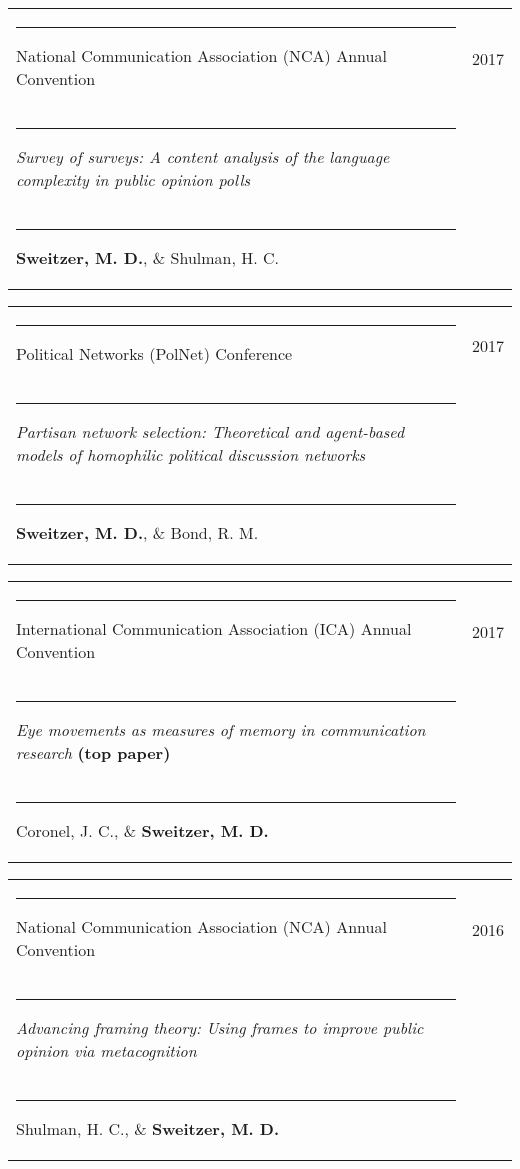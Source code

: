 \documentclass[letterpaper, 10pt]{extarticle}
\begin{document}
\vspace{0.5em}
\begin{tabularx}{\textwidth}{Xr}
\rule{0.5em}{0pt}{\small National Communication Association (NCA) Annual Convention} & {\small 2017}\vspace{0.25em}\\
\rule{1em}{0pt}{\raggedright \small \textit{Survey of surveys: A content analysis of the language complexity in public opinion polls}}\\
\rule{1.25em}{0pt}{\small \textbf{Sweitzer, M. D.}, \& Shulman, H. C.}
\end{tabularx}

\vspace{0.5em}
\begin{tabularx}{\textwidth}{Xr}
\rule{0.5em}{0pt}{\small Political Networks (PolNet) Conference} & {\small 2017}\vspace{0.25em}\\
\rule{1em}{0pt}{\raggedright \small \textit{Partisan network selection: Theoretical and agent-based models of homophilic political discussion networks}}\\
\rule{1.25em}{0pt}{\small \textbf{Sweitzer, M. D.}, \& Bond, R. M.}
\end{tabularx}

\vspace{0.5em}
\begin{tabularx}{\textwidth}{Xr}
\rule{0.5em}{0pt}{\small International Communication Association (ICA) Annual Convention} & {\small 2017}\vspace{0.25em}\\
\rule{1em}{0pt}{\raggedright \small \textit{Eye movements as measures of memory in communication research} \textbf{(top paper)}}\\
\rule{1.25em}{0pt}{\small Coronel, J. C., \& \textbf{Sweitzer, M. D.}}
\end{tabularx}

\vspace{0.5em}
\begin{tabularx}{\textwidth}{Xr}
\rule{0.5em}{0pt}{\small National Communication Association (NCA) Annual Convention} & {\small 2016}\vspace{0.25em}\\
\rule{1em}{0pt}{\raggedright \small \textit{Advancing framing theory: Using frames to improve public opinion via metacognition}}\\
\rule{1.25em}{0pt}{\small Shulman, H. C., \& \textbf{Sweitzer, M. D.}}
\end{tabularx}
\end{document}
